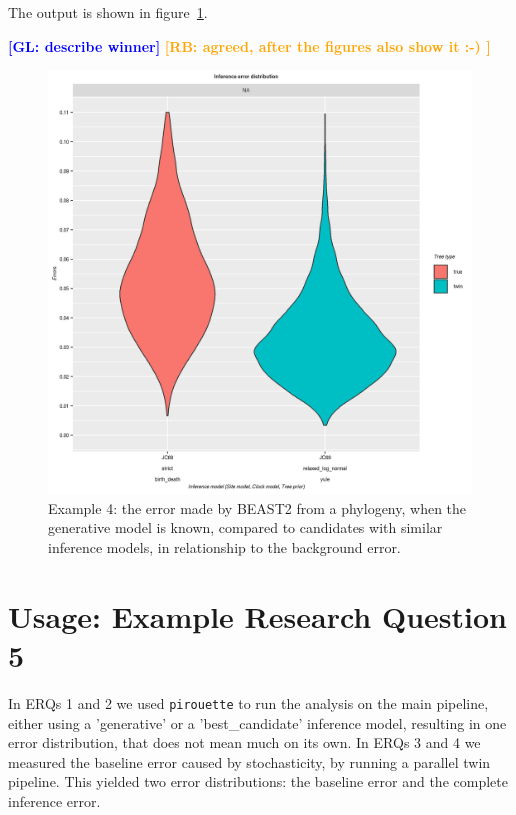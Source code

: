 \documentclass{article}
\newcommand{\giovanni}[1]{\textcolor{blue}{\textbf{[GL: #1]}}}
\newcommand{\richel}[1]{\textcolor{orange}{\textbf{[RB: #1]}}}
\begin{document}
The output is shown in figure~\ref{fig:example_4}.

\giovanni{describe winner}
\richel{agreed, after the figures also show it :-) }

\begin{figure}[ht]
  \includegraphics[width=\textwidth]{example_4/errors.png}
  \caption{
    Example 4: the error made by BEAST2 from a phylogeny, when the generative 
    model is known, compared to candidates with similar inference models, in 
    relationship to the background error.
  }
  \label{fig:example_4}
\end{figure}


\section{Usage: Example Research Question 5}

In ERQs 1 and 2 we used \verb;pirouette; to  
run the analysis on the main pipeline, either using a 'generative' or a 
'best\_candidate' inference model, resulting in one error distribution,
that does not mean much on its own.
In ERQs 3 and 4 we measured the baseline error caused by stochasticity,
by running a parallel twin pipeline. This yielded two error distributions:
the baseline error and the complete inference error.
\end{document}

